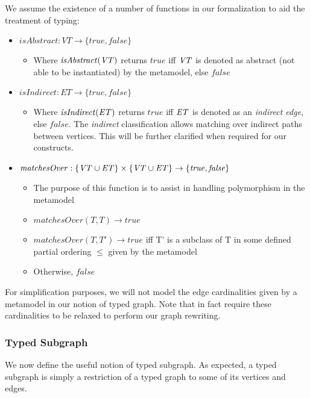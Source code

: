 We assume the existence of a number of functions in our formalization to aid the treatment of typing:

\begin{itemize}
\item $\mathit{isAbstract}: \mathit{VT} \rightarrow \{\mathit{true}, \mathit{false}\}$
\begin{itemize}
\item Where $\mathit{isAbstract}(\mathit{VT})$ returns $\mathit{true}$ iff $\mathit{VT}$ is denoted as abstract (not able to be instantiated) by the metamodel, else $\mathit{false}$
\end{itemize}

\item $\mathit{isIndirect}: \mathit{ET} \rightarrow \{\mathit{true}, \mathit{false}\}$
\begin{itemize}
\item Where $\mathit{isIndirect}(\mathit{ET})$ returns $\mathit{true}$ iff $\mathit{ET}$ is denoted as an \textit{indirect edge}, else $\mathit{false}$. The \textit{indirect} classification allows matching over indirect paths between vertices. This will be further clarified when required for our constructs.
\end{itemize}

\item $\mathit{matchesOver}: \{\mathit{VT} \cup \mathit{ET}\} \times \{\mathit{VT} \cup \mathit{ET}\} \rightarrow \{\mathit{true}, \mathit{false}\}$

\begin{itemize}
\item The purpose of this function is to assist in handling polymorphism in the metamodel
\item $\mathit{matchesOver}(T, T) \rightarrow \mathit{true}$
\item $\mathit{matchesOver}(T, T') \rightarrow \mathit{true}$ iff T' is a subclass of T in some defined partial ordering $\leq$ given by the metamodel
\item Otherwise, $\mathit{false}$
\end{itemize}
\end{itemize}

For simplification purposes, we will not model the edge cardinalities given by a metamodel in our notion of typed graph. Note that in fact require these cardinalities to be relaxed to perform our graph rewriting.

\subsubsection*{Typed Subgraph}
We now define the useful notion of typed subgraph. As expected, a typed subgraph is simply a restriction of a typed graph to some of its vertices and edges. 

